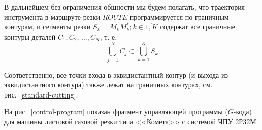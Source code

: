 \documentclass[11pt,twoside,openany]{report}
\begin{document}
В дальнейшем без ограничения общности мы будем полагать,
что траектория инструмента в маршруте резки $ROUTE$
программируется по граничным контурам,
и сегменты резки
$S_k=M_kM^*_k; k \in \overline{1,K}$
содержат все граничные контуры деталей
$C_1, C_2, \,\dots, C_N$,
т. е.
$$
\bigcup_{j=1}^N C_j \subset \bigcup_{k=1}^K S_k
$$

Соответственно, все точки входа в эквидистантный контур
(и выхода из эквидистантного контура)
также лежат на граничных контурах,
см. рис.~\ref{standard-cutting}.

На рис.~\ref{control-program}
показан фрагмент управляющей программы
($G$-кода) для машины листовой газовой резки
типа <<Комета>> с системой ЧПУ 2Р32М.

\begin{figure}
\begin{multicols}{3}


\end{multicols}
\end{figure}
\end{document}
